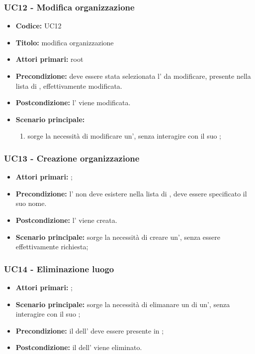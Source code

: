\documentclass[casi-duso]{subfiles}
\begin{document}
\subsubsection{UC12 - Modifica organizzazione}
\label{subsub:UC12}
\begin{itemize}
  \item \textbf{Codice:} UC12
  \item \textbf{Titolo:} modifica organizzazione
  \item \textbf{Attori primari:} root
  \item \textbf{Precondizione:} deve essere stata selezionata l' da modificare, presente nella lista di , effettivamente modificata.
  \item \textbf{Postcondizione:} l' viene modificata.
  \item \textbf{Scenario principale:}
  \begin{enumerate}
    \item sorge la necessità di modificare un', senza interagire con il suo ;
  \end{enumerate}
\end{itemize}

\subsubsection{UC13 - Creazione organizzazione}
\label{subsub:UC13}
\begin{itemize}
  \item \textbf{Attori primari:} ;
  \item \textbf{Precondizione:} l' non deve esistere nella lista di , deve essere specificato il suo nome.
  \item \textbf{Postcondizione:} l' viene creata.
  \item \textbf{Scenario principale:} sorge la necessità di creare un', senza essere effettivamente richiesta;
  
\end{itemize}

\subsubsection{UC14 - Eliminazione luogo}
\label{subsub:UC14}
\begin{itemize}
  \item \textbf{Attori primari:} ;
  \item \textbf{Scenario principale:} sorge la necessità di elimanare un  di un', senza interagire con il suo ;
  \item \textbf{Precondizione:} il  dell' deve essere presente in ;
  \item \textbf{Postcondizione:} il  dell' viene eliminato.

\end{itemize}
\end{document}
